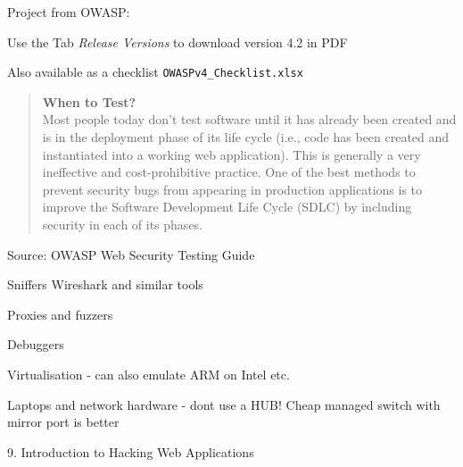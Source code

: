 \documentclass[Screen16to9,17pt]{foils}
\begin{document}
\begin{list2}
\item Project from OWASP:\\
\item Use the Tab \emph{Release Versions} to download version 4.2 in PDF
\item Also available as a checklist \verb+OWASPv4_Checklist.xlsx+
\end{list2}




\begin{quote}\small{\bf
When to Test?}\\
Most people today don’t test software until it has already been created and is in the deployment phase of its life cycle (i.e., code has been created and instantiated into a working web application). This is generally a very ineffective and cost-prohibitive practice. One of the best methods to prevent security bugs from appearing in production applications is to improve the Software Development Life Cycle (SDLC) by including security in each of its phases.
\end{quote}
Source: OWASP Web Security Testing Guide



\begin{list2}
\item Sniffers Wireshark and similar tools
\item Proxies and fuzzers
\item Debuggers
\item Virtualisation - can also emulate ARM on Intel etc.
\item Laptops and network hardware - dont use a HUB! Cheap managed switch with mirror port is better
\end{list2}







{\large 9. Introduction to Hacking Web Applications}
\end{document}
